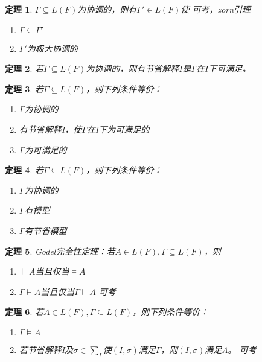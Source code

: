 \documentclass[a4paper]{ctexart}
\newtheorem{thm}{\hspace{2em}定理}[subsection]
\newcommand{\shade}[1]{\colorbox{shadecolor}{#1}}
\begin{document}
\begin{thm}
  $\Gamma\subseteq L(F)$为协调的，则有$\Gamma'\in L(F)$使 \shade{可考，zorn引理}
  \begin{enumerate}[itemindent=2em]
    \item $\Gamma\subseteq\Gamma'$
    \item $\Gamma'$为极大协调的
  \end{enumerate} 
\end{thm}

\begin{thm}
  若$\Gamma\subseteq L(F)$为协调的，则有节省解释$I$是$\Gamma$在$I$下可满足。
\end{thm}

\begin{thm}
  若$\Gamma\subseteq L(F)$，则下列条件等价：
  \begin{enumerate}[itemindent=2em]
    \item $\Gamma$为协调的
    \item 有节省解释I，使$\Gamma$在I下为可满足的
    \item $\Gamma$为可满足的
  \end{enumerate}
\end{thm}

\begin{thm}
  若$\Gamma\subseteq L(F)$，则下列条件等价：
  \begin{enumerate}[itemindent=2em]
    \item $\Gamma$为协调的
    \item $\Gamma$有模型
    \item $\Gamma$有节省模型
  \end{enumerate}
\end{thm}

\begin{thm}
  Godel完全性定理：若$A\in L(F),\Gamma\subseteq L(F)$，则
  \begin{enumerate}[itemindent=2em]
    \item $\vdash A$当且仅当$\models A$
    \item $\Gamma\vdash A$当且仅当$\Gamma\models A$ \shade{可考}
  \end{enumerate}
\end{thm}

\begin{thm}
  若$A\in L(F),\Gamma\subseteq L(F)$，则下列条件等价：
  \begin{enumerate}[itemindent=2em]
    \item $\Gamma\models A$
    \item 若节省解释I及$\sigma\in\sum_I$使$(I,\sigma)$满足$\Gamma$，则$(I,\sigma)$满足A。 \shade{可考}
  \end{enumerate}
\end{thm}
\end{document}
